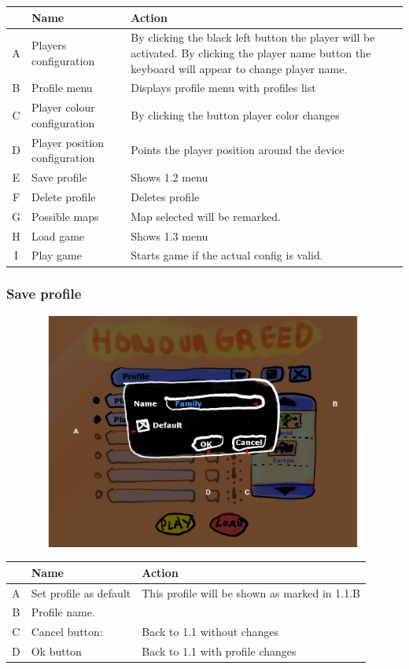 \documentclass[12pt,a4paper]{article}
\begin{document}
\begin{table}[H]
\small
\centering
\begin{tabular}{c|p{5cm}|p{7cm}}
& Name & Action \\ \hline\hline
A
&Players configuration
&By clicking the black left button the player will be activated. By clicking the player name button the keyboard will appear to change player name.
\\B
&Profile menu
&Displays profile menu with profiles list
\\C
&Player colour configuration
&By clicking the button player color changes
\\D
&Player position configuration
&Points the player position around the device
\\E
&Save profile
&Shows 1.2 menu
\\F
&Delete profile
&Deletes profile
\\G
&Possible maps
&Map selected will be remarked.
\\H
&Load game
&Shows 1.3 menu
\\I
&Play game
&Starts game if the actual config is valid.
\end{tabular}
\end{table}

\subsubsection{Save profile}

\begin{figure}[H]
  \centering
  \includegraphics[width=11cm]{pic/mocks/1-2.pdf}
\end{figure}

\begin{table}[H]
\small
\centering
\begin{tabular}{c|p{5cm}|p{7cm}}
& Name & Action \\ \hline\hline
A
&Set profile as default
&This profile will be shown as marked in 1.1.B
\\B
&Profile name.
&
\\C
&Cancel button:
&Back to 1.1 without changes
\\D
&Ok button
&Back to 1.1 with profile changes
\end{tabular}
\end{table}
\end{document}
